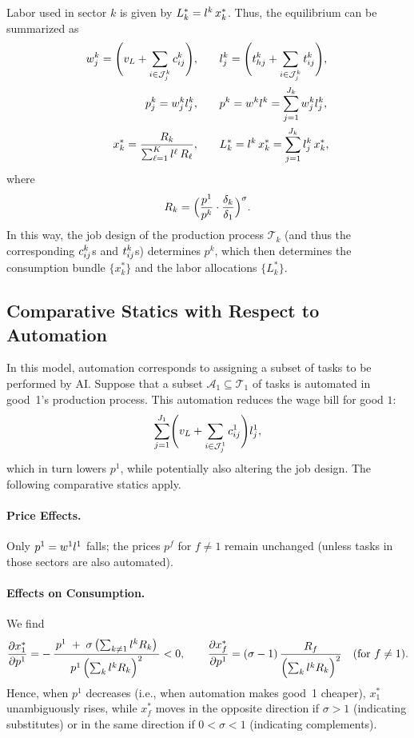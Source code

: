 \documentclass{article}
\theoremstyle{plain}
\theoremstyle{plain}
\begin{document}
Labor used in sector $k$ is given by $L_k^* = l_{}^k\,x_k^*$.
Thus, the equilibrium can be summarized as
\begin{align*}
w_j^k = \Biggl(v_L + \sum_{i \in \mathcal{J}_j^k} c_{ij}^{k}\Biggr), 
& \qquad
l_{j}^k = \Biggl(t_{hj}^k + \sum_{i \in \mathcal{J}_j^k} t_{ij}^{k}\Biggr), \\
p_j^k = w_j^k l_{j}^k,
& \qquad
p^k = w^k l_{}^k = \sum_{j=1}^{J_k} w_j^k l_{j}^k, \\
x_k^* = \frac{R_k}{\sum_{\ell=1}^K l_{}^\ell\,R_\ell},
& \qquad
L_k^* = l_{}^k\,x_k^* = \sum_{j=1}^{J_k} l_{j}^k\,x_k^*,
\end{align*}
where
\[
R_k = \Bigl(\frac{p^1}{p^k} \cdot \frac{\delta_k}{\delta_1}\Bigr)^{\sigma}.
\]
In this way, the job design of the production process $\mathcal{T}_k$ (and thus the corresponding $c_{ij}^k$s and $t_{ij}^k$s) determines $p^k$, which then determines the consumption bundle $\{x_k^*\}$ and the labor allocations $\{L_k^*\}$.


\subsection{Comparative Statics with Respect to Automation}

In this model, automation corresponds to assigning a subset of tasks to be performed by AI.  
Suppose that a subset $\mathcal{A}_1 \subseteq \mathcal{T}_1$ of tasks is automated in good~1’s production process.  
This automation reduces the wage bill for good $1$:
\[
\sum_{j=1}^{J_1} \Biggl( v_L + \sum_{i \in \mathcal{J}_j^1} c_{ij}^{1} \Biggr) l_{j}^1,
\]
which in turn lowers $p^1$, while potentially also altering the job design.  
The following comparative statics apply.

\paragraph{Price Effects.}
Only $p^1 = w^1 l_{}^1$ falls; the prices $p^f$ for $f\neq 1$ remain unchanged (unless tasks in those sectors are also automated).

\paragraph{Effects on Consumption.}
We find
\[
\frac{\partial x_{1}^*}{\partial p^1}
=
-\,
\frac{\,p^1 \;+\;\sigma\,\bigl(\sum_{k\neq 1}l_{}^kR_{k}\bigr)\,}{
       p^1\,\Bigl(\sum_{k}l_{}^kR_{k}\Bigr)^{2}}
<0,
\qquad
\frac{\partial x_{f}^*}{\partial p^1}
=
(\sigma-1)
\,\frac{\,R_{f}\,}{\Bigl(\sum_{k}l_{}^kR_{k}\Bigr)^{2}}
\quad (\text{for } f\neq 1).
\]
Hence, when $p^1$ decreases (i.e., when automation makes good~1 cheaper), $x_{1}^*$ unambiguously rises, while $x_{f}^*$ moves in the opposite direction if $\sigma>1$ (indicating substitutes) or in the same direction if $0<\sigma<1$ (indicating complements).
\end{document}
